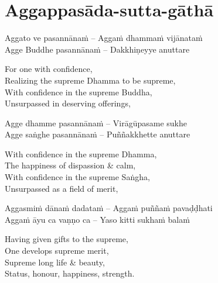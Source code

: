 \suttaRef{[MJG]}

\section{Aggappasāda-sutta-gāthā}
\label{aggappasada-sutta-gatha}

 \vspace{-0.6em}

\begin{twochants}
  Aggato ve pasannānaṁ – Aggaṁ dhammaṁ vijānataṁ\\
  Agge Buddhe pasannānaṁ – Dakkhiṇeyye anuttare
\end{twochants}

\begin{english-verses}
  For one with confidence,\\
  Realizing the supreme Dhamma to be supreme,\\
  With confidence in the supreme Buddha,\\
  Unsurpassed in deserving offerings,
\end{english-verses}

\begin{twochants}
  Agge dhamme pasannānaṁ – Virāgūpasame sukhe\\
  Agge saṅghe pasannānaṁ – Puññakkhette anuttare
\end{twochants}

\begin{english-verses}
  With confidence in the supreme Dhamma,\\
  The happiness of dispassion \& calm,\\
  With confidence in the supreme Saṅgha,\\
  Unsurpassed as a field of merit,
\end{english-verses}

\begin{twochants}
  Aggasmiṁ dānaṁ dadataṁ – Aggaṁ puññaṁ pavaḍḍhati\\
  Aggaṁ āyu ca vaṇṇo ca – Yaso kitti sukhaṁ balaṁ
\end{twochants}

\begin{english-verses}
  Having given gifts to the supreme,\\
  One develops supreme merit,\\
  Supreme long life \& beauty,\\
  Status, honour, happiness, strength.
\end{english-verses}

